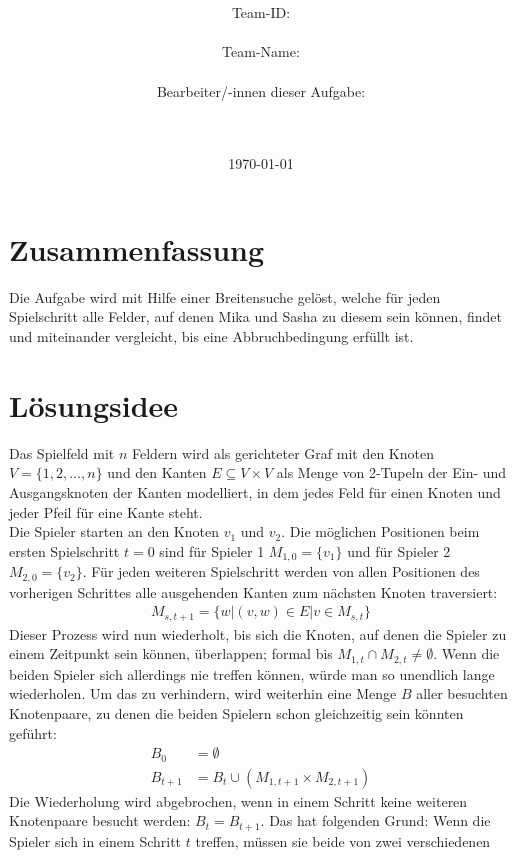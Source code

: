 \documentclass[a4paper,10pt,ngerman]{scrartcl}
\title{\textbf{\Huge\Aufgabe}}
\author{\LARGE Team-ID: \LARGE \TeamId \\\\
  \LARGE Team-Name: \LARGE \TeamName \\\\
  \LARGE Bearbeiter/-innen dieser Aufgabe: \\
  \LARGE \Namen\\\\}
\date{\LARGE\today}
\begin{document}
\maketitle
\tableofcontents

\vspace{0.5cm}

\section{Zusammenfassung}
Die Aufgabe wird mit Hilfe einer Breitensuche gelöst, welche für jeden
Spielschritt alle Felder, auf denen Mika und Sasha zu diesem sein können,
findet und miteinander vergleicht, bis eine Abbruchbedingung erfüllt ist.
\section{Lösungsidee}
Das Spielfeld mit $n$ Feldern wird als gerichteter Graf mit den Knoten
$V=\{1,2,\ldots,n\}$ und den Kanten $E \subseteq V \times V$ als Menge von
2-Tupeln der Ein- und Ausgangsknoten der Kanten modelliert, in dem jedes Feld
für einen Knoten und jeder Pfeil für eine Kante steht. \\ Die Spieler starten
an den Knoten $v_1$ und $v_2$. Die möglichen Positionen beim ersten
Spielschritt $t=0$ sind für Spieler 1 $M_{1,0}=\{v_1\}$ und für Spieler 2
$M_{2,0}=\{v_2\}$. Für jeden weiteren Spielschritt werden von allen Positionen
des vorherigen Schrittes alle ausgehenden Kanten zum nächsten Knoten
traversiert:
\begin{align*}
  M_{s,t+1} = \{w | (v, w) \in E | v \in M_{s, t}\}
\end{align*}
Dieser Prozess wird nun wiederholt, bis sich die Knoten, auf denen die Spieler zu einem Zeitpunkt sein können, überlappen;
formal bis $M_{1, t} \cap M_{2, t} \neq \emptyset$. Wenn die beiden Spieler sich allerdings nie treffen können, würde man so
unendlich lange wiederholen. Um das zu verhindern, wird weiterhin eine Menge $B$ aller besuchten Knotenpaare, zu denen die
beiden Spielern schon gleichzeitig sein könnten geführt:
\begin{align*}
  B_0     & = \emptyset                                \\
  B_{t+1} & = B_{t} \cup (M_{1,t+1} \times M_{2, t+1})
\end{align*}
Die Wiederholung wird abgebrochen, wenn in einem Schritt keine weiteren Knotenpaare besucht werden: $B_t = B_{t+1}$.
Das hat folgenden Grund: Wenn die Spieler sich in einem Schritt $t$ treffen, müssen sie beide von zwei verschiedenen
\end{document}
